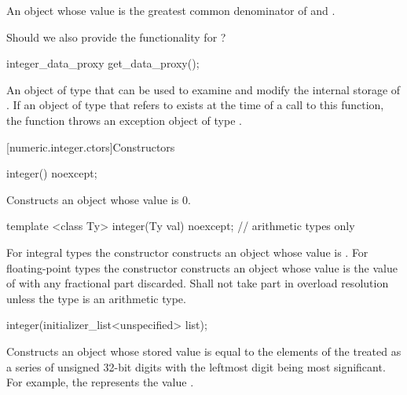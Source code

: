 \begin{addedblock}
\begin{itemdescr}
\returns An object whose value is the greatest common denominator of  and .		
\end{itemdescr}

\begin{modifcommentblock}
Should we also provide the  functionality for ?
\end{modifcommentblock}

\begin{itemdecl}
integer_data_proxy get_data_proxy();	
\end{itemdecl}

\begin{itemdescr}
\returns An object of type  that can be used to examine and modify the internal storage of . If an object of type  that refers to  exists at the time of a call to this function, the function throws an exception object of type .		
\end{itemdescr}

[numeric.integer.ctors]{Constructors}

\begin{itemdecl}
integer() noexcept;	
\end{itemdecl}

\begin{itemdescr}
\effects Constructs an object whose value is 0.		
\end{itemdescr}

\begin{itemdecl}
template <class Ty>
  integer(Ty val) noexcept; // arithmetic types only	
\end{itemdecl}

\begin{itemdescr}
\effects For integral types the constructor constructs an object whose value is . For floating-point types the constructor constructs an object whose value is the value of  with any fractional part discarded. Shall not take part in overload resolution unless the type  is an arithmetic type. 		
\end{itemdescr}

\begin{itemdecl}
integer(initializer_list<unspecified> list);	
\end{itemdecl}

\begin{itemdescr}
\effects Constructs an object whose stored value is equal to the elements of the  treated as a series of unsigned 32-bit digits with the leftmost digit being most significant. For example, the  represents the value .		
\end{itemdescr}


\end{addedblock}
